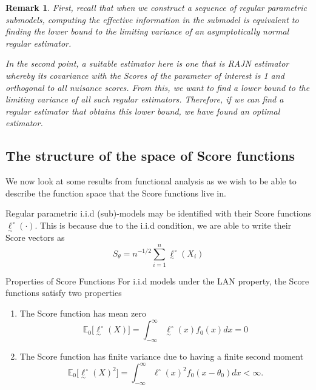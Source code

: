 \documentclass[twoside]{article}
\newtheorem{remark}[theorem]{Remark}
\newcommand{\utilde}{\underset{\sim}}
\begin{document}
\begin{remark}
First, recall that when we construct a sequence of regular parametric submodels, computing the effective information in the submodel is equivalent to finding the lower bound to the limiting variance of an asymptotically normal regular estimator.

In the second point, a suitable estimator here is one that is RAJN estimator whereby its covariance with the Scores of the parameter of interest is 1 and orthogonal to all nuisance scores. From this, we want to find a lower bound to the limiting variance of all such regular estimators. Therefore, if we can find a regular estimator that obtains this lower bound, we have found an optimal estimator.
\end{remark}


\subsection{The structure of the space of Score functions}

We now look at some results from functional analysis as we wish to be able to describe the function space that the Score functions live in.

Regular parametric i.i.d (sub)-models may be identified with their Score functions $\utilde{\ell}^{\circ}(\cdot).$ This is because due to the i.i.d condition, we are able to write their Score vectors as 
\begin{equation}
  S_{\theta} = n^{-1/2}\sum_{i=1}^{n}\utilde{\ell}^{\circ}(X_i)
\end{equation}

\begin{proposition_exam}{Properties of Score Functions}{}
For i.i.d models under the LAN property, the Score functions satisfy two properties
\begin{enumerate}
\item The Score function has mean zero
  \begin{equation}
    \mathbb{E}_{0}\bigg[\utilde{\ell}^{\circ}(X) \bigg] = \int_{-\infty}^{\infty}\utilde{\ell}^{\circ}(x)f_0(x)dx = 0
  \end{equation}
\item The Score function has finite variance due to having a finite second moment
  \begin{equation}
    \mathbb{E}_{0}\bigg[\utilde{\ell}^{\circ}(X)^2 \bigg] = \int_{-\infty}^{\infty}\ell^{\circ}(x)^2f_0(x - \theta_0)dx < \infty.
  \end{equation}
\end{enumerate}
\end{proposition_exam}
\end{document}
